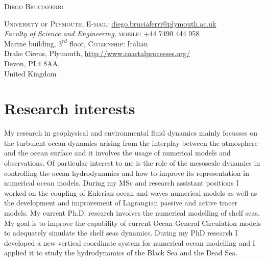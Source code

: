 \documentclass[a4paper, oneside, final]{scrartcl}
\newcommand\YUGE{\fontsize{30}{60}\selectfont}
\begin{document}

\begin{center}
\YUGE \textsc{Diego Bruciaferri}\\
\end{center}
\bigskip%
\textsc{University of Plymouth}, \hspace{3.9cm} \textsc{E-mail}: \href{mailto:diego.bruciaferri@plymouth.ac.uk}{diego.bruciaferri@plymouth.ac.uk}\\
\textit{Faculty of Science and Engineering}, \hspace{5.2cm} \textsc{mobile}: +44 7490 444 958\\
Marine building, $3^{rd}$ floor, \hspace{7.85cm} \textsc{Citizenship}: Italian\\
Drake Circus, Plymouth, \hspace{5.4cm} \url{http://www.coastalprocesses.org/}\\
Devon, PL4 8AA,\\
United Kingdom \\

\section{Research interests}
\normalsize
\noindent
My research in geophysical and environmental fluid dynamics mainly focusses on the turbulent ocean dynamics arising from the interplay between the atmosphere and the ocean surface and it involves the usage of numerical models and observations.   Of particular interest to me is the role of the mesoscale dynamics in controlling the ocean hydrodynamics and how to improve its representation in numerical ocean models. During my MSc and research assistant positions I worked on the coupling of Eulerian ocean and waves numerical models as well as the development and improvement of Lagrangian passive and active tracer models. My current Ph.D. research involves the numerical modelling of shelf seas. My goal is to improve the capability of current Ocean General Circulation models to adequately simulate the shelf seas dynamics. During my PhD research I developed a new vertical coordinate system for numerical ocean modelling and I applied it to study the hydrodynamics of the Black Sea and the Dead Sea.
\end{document}
